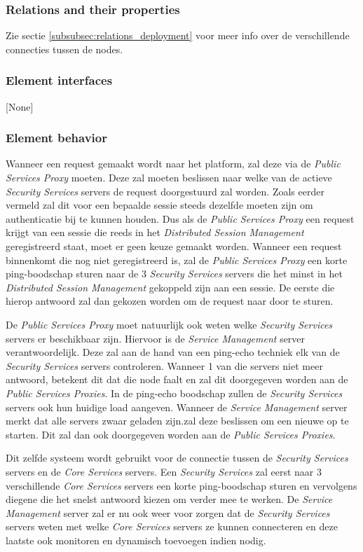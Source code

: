 \documentclass[a4paper,10pt]{article}
\begin{document}
\subsubsection{Relations and their properties}
Zie sectie \ref{subsubsec:relations_deployment} voor meer info over de verschillende connecties tussen de nodes.

\subsubsection{Element interfaces}
[None]

\subsubsection{Element behavior}
Wanneer een request gemaakt wordt naar het platform, zal deze via de \textit{Public Services Proxy} moeten. Deze zal moeten beslissen naar welke van de actieve \textit{Security Services} servers de request doorgestuurd zal worden. Zoals eerder vermeld zal dit voor een bepaalde sessie steeds dezelfde moeten zijn om authenticatie bij te kunnen houden. Dus als de \textit{Public Services Proxy} een request krijgt van een sessie die reeds in het \textit{Distributed Session Management} geregistreerd staat, moet er geen keuze gemaakt worden. Wanneer een request binnenkomt die nog niet geregistreerd is, zal de \textit{Public Services Proxy} een korte ping-boodschap sturen naar de 3 \textit{Security Services} servers die het minst in het \textit{Distributed Session Management} gekoppeld zijn aan een sessie. De eerste die hierop antwoord zal dan gekozen worden om de request naar door te sturen.

De \textit{Public Services Proxy} moet natuurlijk ook weten welke \textit{Security Services} servers er beschikbaar zijn. Hiervoor is de \textit{Service Management} server verantwoordelijk. Deze zal aan de hand van een ping-echo techniek elk van de \textit{Security Services} servers controleren. Wanneer 1 van die servers niet meer antwoord, betekent dit dat die node faalt en zal dit doorgegeven worden aan de \textit{Public Services Proxies}. In de ping-echo boodschap zullen de \textit{Security Services} servers ook hun huidige load aangeven. Wanneer de \textit{Service Management} server merkt dat alle servers zwaar geladen zijn.zal deze beslissen om een nieuwe op te starten. Dit zal dan ook doorgegeven worden aan de \textit{Public Services Proxies}.

Dit zelfde systeem wordt gebruikt voor de connectie tussen de \textit{Security Services} servers en de \textit{Core Services} servers. Een \textit{Security Services} zal eerst naar 3 verschillende \textit{Core Services} servers een korte ping-boodschap sturen en vervolgens diegene die het snelst antwoord kiezen om verder mee te werken. De \textit{Service Management} server zal er nu ook weer voor zorgen dat de \textit{Security Services} servers weten met welke \textit{Core Services} servers ze kunnen connecteren en deze laatste ook monitoren en dynamisch toevoegen indien nodig.
\end{document}

